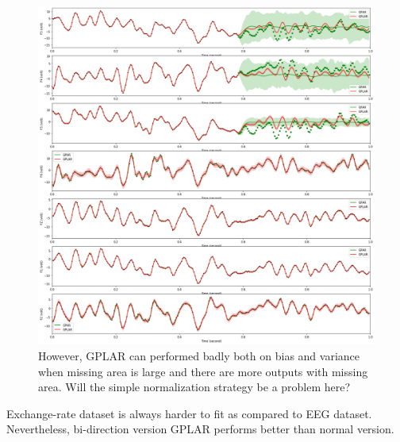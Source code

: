 \documentclass{article}
\begin{document}
\begin{figure}[H]
\centering
\includegraphics[width=.8\linewidth]{eeg-bidirectional-3.png}
\caption{However, GPLAR can performed badly both on bias and variance when missing area is large and there are more outputs with missing area. Will the simple normalization strategy be a problem here?}
\end{figure}

Exchange-rate dataset is always harder to fit as compared to EEG dataset. Nevertheless, bi-direction version GPLAR performs better than normal version. 
\end{document}
